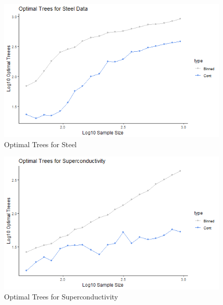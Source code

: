 \documentclass[10pt]{article}\usepackage[]{graphicx}\usepackage[]{xcolor}
\begin{document}
\begin{figure}[htp]
  \centering
  \includegraphics[scale=0.8]{effects_of_sample_size/corrected_steel_optimal_trees.png}
  \caption{Optimal Trees for Steel}
  \label{img:steel_samp}
\end{figure}



\begin{figure}[htp]
  \centering
  \includegraphics[scale=0.8]{effects_of_sample_size/corrected_conduct_optimal_trees.png}
  \caption{Optimal Trees for Superconductivity}
  \label{img:conduct_samp}
\end{figure}
\end{document}
